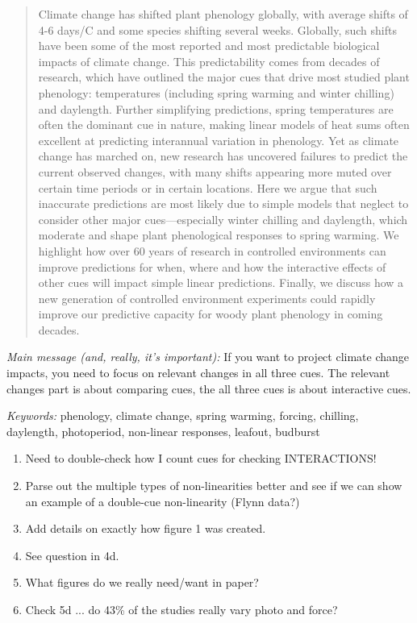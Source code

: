 \documentclass[11pt,letterpaper]{article}
\begin{document}
\begin{abstract}
Climate change has shifted plant phenology globally, with average shifts of 4-6 days/\textdegree C and some species shifting several weeks. Globally, such shifts have been some of the most reported and most predictable biological impacts of climate change. This predictability comes from decades of research, which have outlined the major cues that drive most studied plant phenology: temperatures (including spring warming and winter chilling) and daylength. Further simplifying predictions, spring temperatures are often the dominant cue in nature, making linear models of heat sums often excellent at predicting interannual variation in phenology. Yet as climate change has marched on, new research has uncovered failures to predict the current observed changes, with many shifts appearing more muted over certain time periods or in certain locations. Here we argue that such inaccurate predictions are most likely due to simple models that neglect to consider other major cues---especially winter chilling and daylength, which moderate and shape plant phenological responses to spring warming. We highlight how over 60 years of research in controlled environments can improve predictions for when, where and how the interactive effects of other cues will impact simple linear predictions. Finally, we discuss how a new generation of controlled environment experiments could rapidly improve our predictive capacity for woody plant phenology in coming decades.  
\end{abstract}

\noindent \emph{Main message (and, really, it's important):} If you want to project climate change impacts, you need to focus on relevant changes in all three cues. The relevant changes part is about comparing cues, the all three cues is about interactive cues.

\noindent \emph{Keywords:} phenology, climate change, spring warming, forcing, chilling, daylength, photoperiod, non-linear responses, leafout, budburst\\

\newpage
{}
\begin{enumerate}
\item Need to double-check how I count cues for checking INTERACTIONS!
\item Parse out the multiple types of non-linearities better and see if we can show an example of a double-cue non-linearity (Flynn data?)
\item Add details on exactly how figure 1 was created.
\item See question in 4d.
\item What figures do we really need/want in paper?
\item Check 5d ... do 43\% of the studies really vary photo and force?
\end{enumerate}
\end{document}
